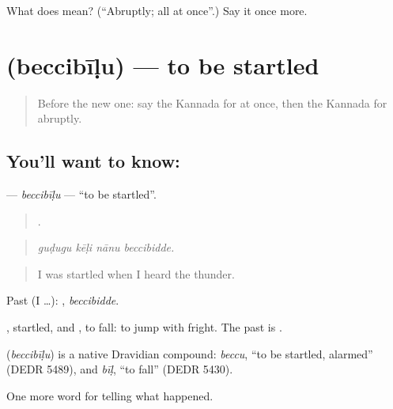 \begin{tcolorbox}[breakable,colback=teal!4,colframe=teal!35!black,title={Before you move on}]
What does  mean? (\textquotedblleft{}Abruptly; all at once\textquotedblright{}.) Say it once more.
\end{tcolorbox}
\section[\texorpdfstring{\kn{ಬೆಚ್ಚಿಬೀಳು} (beccibīḷu)}{ಬೆಚ್ಚಿಬೀಳು (beccibīḷu)}]{ (beccibīḷu) — to be startled}

\label{lesson:KA-C327-beccibilu}



\begin{quote}
Before the new one: say the Kannada for at once, then the Kannada for abruptly.
\end{quote}

\subsection*{You'll want to know: }
\textbf{} — \emph{beccibīḷu} — \textquotedblleft{}to be startled\textquotedblright{}.

\begin{quote}
   .
\end{quote}

\begin{quote}
\emph{guḍugu kēḷi nānu beccibidde.}
\end{quote}

\begin{quote}
I was startled when I heard the thunder.
\end{quote}

Past (I …): , \emph{beccibidde}.

, startled, and , to fall: to jump with fright. The past is .

\begin{cousinweb}
\textbf{} (\emph{beccibīḷu}) is a native Dravidian compound: \emph{beccu}, \textquotedblleft{}to be startled, alarmed\textquotedblright{} (DEDR 5489), and \emph{bīḷ}, \textquotedblleft{}to fall\textquotedblright{} (DEDR 5430).
\end{cousinweb}

\begin{grammarlens}[title={What you've built}]
One more word for telling what happened.
\end{grammarlens}

